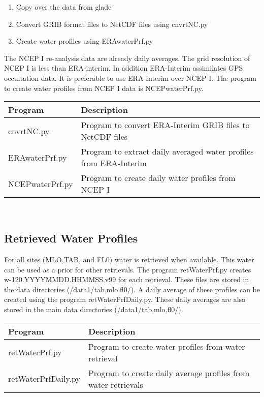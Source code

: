 \documentclass[12pt, letterpaper]{article}
\begin{document}
\begin{enumerate}
\item Copy over the data from glade
\item Convert GRIB format files to NetCDF files using cnvrtNC.py
\item Create water profiles using ERAwaterPrf.py
\end{enumerate}

\noindent The NCEP I re-analysis data are already daily averages. The grid resolution of NCEP I is less than ERA-interim. In addition ERA-Interim assimilates GPS occultation data. It is preferable to use ERA-Interim over NCEP I. The program to create water profiles from NCEP I data is NCEPwaterPrf.py.\\

\begin{tabular}{ l l }
\textbf{Program} & \textbf{Description} \\
\hline
cnvrtNC.py     & Program to convert ERA-Interim GRIB files to NetCDF files\\
ERAwaterPrf.py & Program to extract daily averaged water profiles from ERA-Interim\\
NCEPwaterPrf.py& Program to create daily water profiles from NCEP I\\
\end{tabular} \\


\subsection{Retrieved Water Profiles}
\label{sec:RWP}
For all sites (MLO,TAB, and FL0) water is retrieved when available. This water can be used as a prior for other retrievals. The program retWaterPrf.py creates w-120.YYYYMMDD.HHMMSS.v99 for each retrieval. These files are stored in the data directories (/data1/tab,mlo,fl0/). A daily average of these profiles can be created using the program retWaterPrfDaily.py. These daily averages are also stored in the main data directories (/data1/tab,mlo,fl0/).\\

\begin{tabular}{ l l }
\textbf{Program} & \textbf{Description} \\
\hline
retWaterPrf.py      & Program to create water profiles from water retrieval\\
retWaterPrfDaily.py & Program to create daily average profiles from water retrievals\\
\end{tabular} \\
\end{document}
